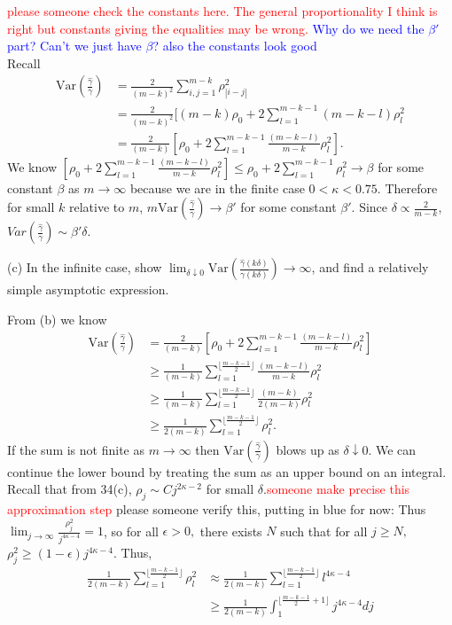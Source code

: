 \documentclass{article}
\begin{document}
\textcolor{red}{please someone check the constants here. The general proportionality I think is right but constants giving the equalities may be wrong.}
\textcolor{blue}{Why do we need the $\beta'$ part? Can't we just have $\beta$? also the constants look good}\\
Recall 
\begin{align*}
    \text{Var}\left(\frac{\hat{\gamma}}{\gamma}\right) &= \frac{2}{(m-k)^2} \sum_{i,j=1}^{m-k} \rho_{|i-j|}^2\\&=\frac{2}{(m-k)^2} [(m-k)\rho_{0}+2\sum_{l=1}^{m-k-1} (m-k-l)\rho_{l}^2\\
    &= \frac{2}{(m-k)} [\rho_{0}+2\sum_{l=1}^{m-k-1} \frac{(m-k-l)}{m-k}\rho_{l}^2].
\end{align*}
We know $[\rho_{0}+2\sum_{l=1}^{m-k-1} \frac{(m-k-l)}{m-k}\rho_{l}^2] \leq \rho_{0}+2\sum_{l=1}^{m-k-1} \rho_{l}^2\rightarrow \beta$ for some constant $\beta$ as $m\to\infty$ because we are in the finite case $0<\kappa<0.75$. Therefore for small $k$ relative to $m$,
$m \text{Var}\left(\frac{\hat{\gamma}}{\gamma}\right)\rightarrow \beta'$ for some constant $\beta'$. Since $\delta \propto \frac{2}{m-k}$, $Var(\frac{\hat{\gamma}}{\gamma})\sim \beta'\delta$.
\medskip

\noindent
(c) In the infinite case, show $\lim_{\delta \downarrow 0}\text{Var}\left(\frac{\hat{\gamma}(k\delta)}{\gamma(k\delta)}\right) \to \infty$, and find a relatively simple asymptotic expression.

From (b) we know
\begin{align*}
    \text{Var}\left(\frac{\hat{\gamma}}{\gamma}\right) &= \frac{2}{(m-k)} [\rho_{0}+2\sum_{l=1}^{m-k-1} \frac{(m-k-l)}{m-k}\rho_{l}^2] \\
    &\geq \frac{1}{(m-k)}\sum_{l=1}^{\lfloor\frac{ m-k-1}{2}\rfloor} \frac{(m-k-l)}{m-k}\rho_{l}^2\\
    &\geq \frac{1}{(m-k)}\sum_{l=1}^{\lfloor\frac{ m-k-1}{2}\rfloor} \frac{(m-k)}{2(m-k)}\rho_{l}^2\\
    &\geq \frac{1}{2(m-k)}\sum_{l=1}^{\lfloor\frac{ m-k-1}{2}\rfloor} \rho_{l}^2.
\end{align*}
If the sum is not finite as $m\rightarrow \infty$ then $\text{Var}\left(\frac{\hat{\gamma}}{\gamma}\right)$ blows up as $\delta\downarrow 0$.
We can continue the lower bound by treating the sum as an upper bound on an integral. 
Recall that from 34(c), $\rho_j\sim C j^{2\kappa-2}$ for small $\delta$.\textcolor{red}{someone make precise this approximation step}
\color{blue}please someone verify this, putting in blue for now: Thus $\lim_{j\to\infty}\frac{\rho_j^2}{j^{4\kappa-4}}=1$, so for all $\epsilon>0,$ there exists $N$ such that for all $j\geq N,$ $\rho_j^2\geq(1-\epsilon)j^{4\kappa-4}$.
Thus,
\color{black}
\begin{align*}
    \frac{1}{2(m-k)}\sum_{l=1}^{\lfloor\frac{ m-k-1}{2}\rfloor} \rho_{l}^2 &\approx \frac{1}{2(m-k)}\sum_{l=1}^{\lfloor\frac{ m-k-1}{2}\rfloor} l^{4\kappa-4} \\
    &\geq \frac{1}{2(m-k)}\int_1^{\lfloor \frac{m-k-1}{2}+1\rfloor}j^{4\kappa-4}dj
\end{align*}
\end{document}
